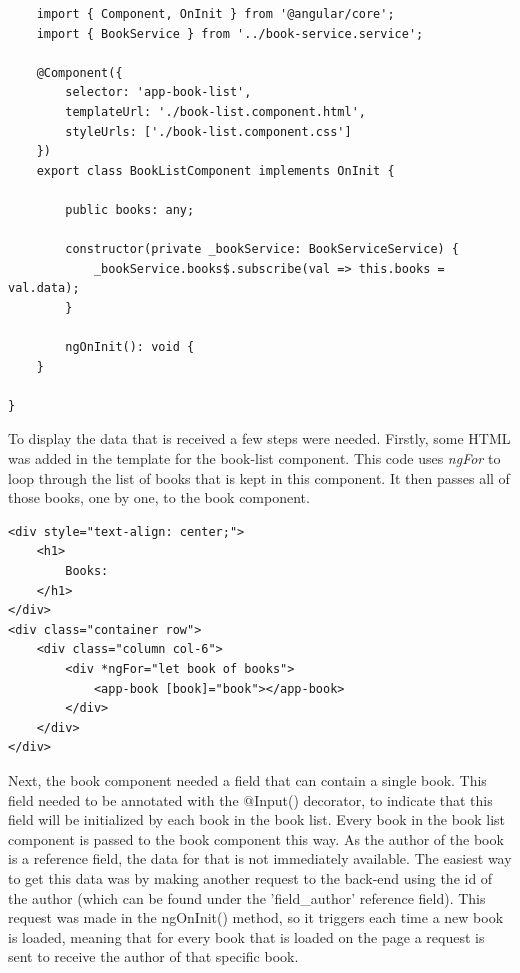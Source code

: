 \begin{lstlisting}
	import { Component, OnInit } from '@angular/core';
	import { BookService } from '../book-service.service';

	@Component({
		selector: 'app-book-list',
		templateUrl: './book-list.component.html',
		styleUrls: ['./book-list.component.css']
	})
	export class BookListComponent implements OnInit {
	
		public books: any;
	
		constructor(private _bookService: BookServiceService) {
			_bookService.books$.subscribe(val => this.books = val.data);
		}
	
		ngOnInit(): void {
	}
	
}
\end{lstlisting}

To display the data that is received a few steps were needed. Firstly, some HTML was added in the template for the book-list component. This code uses \emph{ngFor} to loop through the list of books that is kept in this component. It then passes all of those books, one by one, to the book component.
\begin{lstlisting}
<div style="text-align: center;">
	<h1>
		Books:
	</h1>
</div>
<div class="container row">
	<div class="column col-6">
		<div *ngFor="let book of books">
			<app-book [book]="book"></app-book>
		</div>
	</div>
</div>
\end{lstlisting}

Next, the book component needed a field that can contain a single book. This field needed to be annotated with the @Input() decorator, to indicate that this field will be initialized by each book in the book list. Every book in the book list component is passed to the book component this way. As the author of the book is a reference field, the data for that is not immediately available. The easiest way to get this data was by making another request to the back-end using the id of the author (which can be found under the 'field\_author' reference field). This request was made in the ngOnInit() method, so it triggers each time a new book is loaded, meaning that for every book that is loaded on the page a request is sent to receive the author of that specific book.

